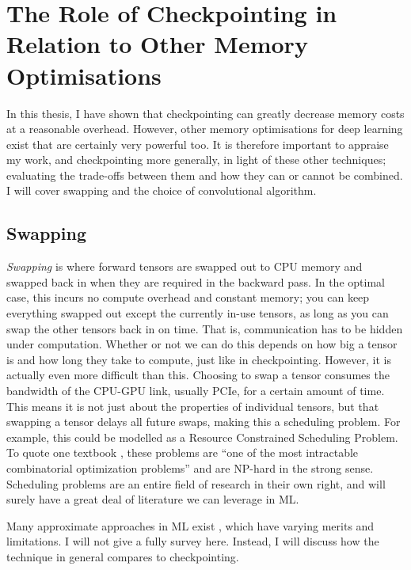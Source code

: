 %
\newpage
\section{The Role of Checkpointing in Relation to Other Memory Optimisations}%

In this thesis, I have shown that checkpointing can greatly decrease memory costs at a reasonable overhead.
However, other memory optimisations for deep learning exist that are certainly very powerful too.
It is therefore important to appraise my work, and checkpointing more generally, in light of these other techniques; evaluating the trade-offs between them and how they can or cannot be combined.
I will cover swapping and the choice of convolutional algorithm.

\subsection{Swapping}
\textit{Swapping} is where forward tensors are swapped out to CPU memory and swapped back in when they are required in the backward pass.
In the optimal case, this incurs no compute overhead and constant memory; you can keep everything swapped out except the currently in-use tensors, as long as you can swap the other tensors back in on time.
That is, communication has to be hidden under computation.
Whether or not we can do this depends on how big a tensor is and how long they take to compute, just like in checkpointing.
However, it is actually even more difficult than this.
Choosing to swap a tensor consumes the bandwidth of the CPU-GPU link, usually PCIe, for a certain amount of time.
This means it is not just about the properties of individual tensors, but that swapping a tensor delays all future swaps, making this a scheduling problem.
For example, this could be modelled as a Resource Constrained Scheduling Problem.
To quote one textbook \cite[p.~23]{Artigues2007-rcps}, these problems are ``one of the most intractable combinatorial optimization problems'' and are NP-hard in the strong sense.
Scheduling problems are an entire field of research in their own right, and will surely have a great deal of literature we can leverage in ML.

Many approximate approaches in ML exist \cite{Zhang2019, Wang2018, Rhu2016, ShriramS2019, Li2019-mem-limited-devices, Le2018-tflms, Chen2019-modnn, Ito2017-ooc-cudnn, Aupy2016, Schanen2016, Kukreja2018, Aupy2019}, which have varying merits and limitations.
I will not give a fully survey here.
Instead, I will discuss how the technique in general compares to checkpointing.

